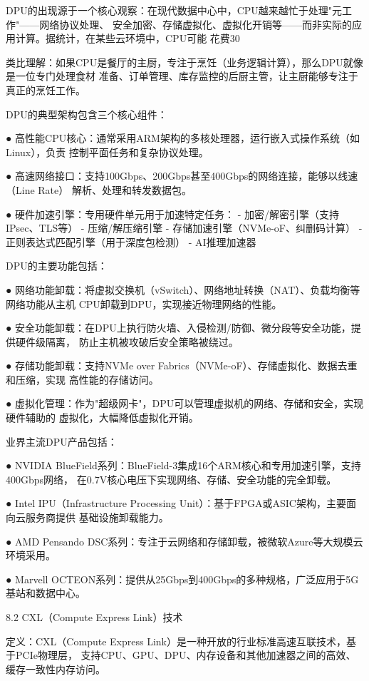 DPU的出现源于一个核心观察：在现代数据中心中，CPU越来越忙于处理"元工作"——网络协议处理、
安全加密、存储虚拟化、虚拟化开销等——而非实际的应用计算。据统计，在某些云环境中，CPU可能
花费30%

类比理解：如果CPU是餐厅的主厨，专注于烹饪（业务逻辑计算），那么DPU就像是一位专门处理食材
准备、订单管理、库存监控的后厨主管，让主厨能够专注于真正的烹饪工作。

DPU的典型架构包含三个核心组件：

● 高性能CPU核心：通常采用ARM架构的多核处理器，运行嵌入式操作系统（如Linux），负责
  控制平面任务和复杂协议处理。
  
● 高速网络接口：支持100Gbps、200Gbps甚至400Gbps的网络连接，能够以线速（Line Rate）
  解析、处理和转发数据包。
  
● 硬件加速引擎：专用硬件单元用于加速特定任务：
  - 加密/解密引擎（支持IPsec、TLS等）
  - 压缩/解压缩引擎
  - 存储加速引擎（NVMe-oF、纠删码计算）
  - 正则表达式匹配引擎（用于深度包检测）
  - AI推理加速器

DPU的主要功能包括：

● 网络功能卸载：将虚拟交换机（vSwitch）、网络地址转换（NAT）、负载均衡等网络功能从主机
  CPU卸载到DPU，实现接近物理网络的性能。
  
● 安全功能卸载：在DPU上执行防火墙、入侵检测/防御、微分段等安全功能，提供硬件级隔离，
  防止主机被攻破后安全策略被绕过。
  
● 存储功能卸载：支持NVMe over Fabrics（NVMe-oF）、存储虚拟化、数据去重和压缩，实现
  高性能的存储访问。
  
● 虚拟化管理：作为"超级网卡"，DPU可以管理虚拟机的网络、存储和安全，实现硬件辅助的
  虚拟化，大幅降低虚拟化开销。

业界主流DPU产品包括：

● NVIDIA BlueField系列：BlueField-3集成16个ARM核心和专用加速引擎，支持400Gbps网络，
  在0.7V核心电压下实现网络、存储、安全功能的完全卸载。
  
● Intel IPU（Infrastructure Processing Unit）：基于FPGA或ASIC架构，主要面向云服务商提供
  基础设施卸载能力。
  
● AMD Pensando DSC系列：专注于云网络和存储卸载，被微软Azure等大规模云环境采用。
  
● Marvell OCTEON系列：提供从25Gbps到400Gbps的多种规格，广泛应用于5G基站和数据中心。

8.2  CXL（Compute Express Link）技术

定义：CXL（Compute Express Link）是一种开放的行业标准高速互联技术，基于PCIe物理层，
支持CPU、GPU、DPU、内存设备和其他加速器之间的高效、缓存一致性内存访问。

